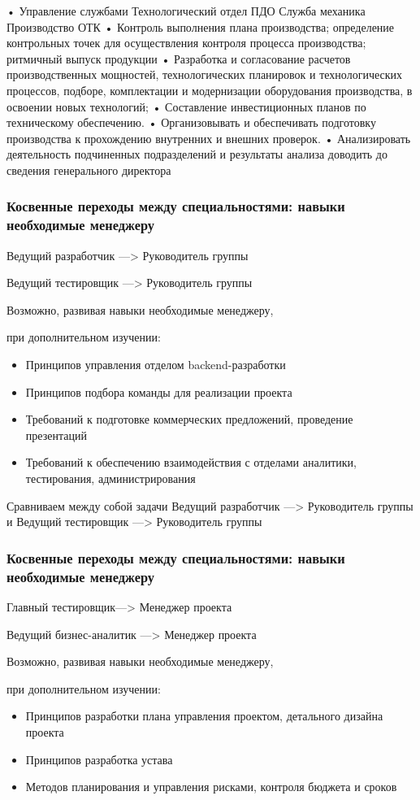 \documentclass{../industrial-development}
\begin{document}
•	Управление службами
	Технологический отдел
	ПДО
Служба механика
	Производство
	ОТК
•	Контроль выполнения плана производства; определение контрольных точек для осуществления контроля процесса производства; ритмичный выпуск продукции
•	Разработка и согласование расчетов производственных мощностей, технологических планировок и технологических процессов, подборе, комплектации и модернизации оборудования производства, в освоении новых технологий;
•	Составление инвестиционных планов по техническому обеспечению.
•	Организовывать и обеспечивать подготовку производства к прохождению внутренних и внешних проверок.
•	Анализировать деятельность подчиненных подразделений и результаты анализа доводить до сведения генерального директора


\begin{frame} \frametitle{Косвенные переходы между специальностями: навыки необходимые менеджеру}

\begin{block}{Ведущий разработчик ---> Руководитель группы  

Ведущий тестировщик ---> Руководитель группы }

Возможно, развивая навыки необходимые менеджеру, 

при дополнительном изучении:
  \end{block}
\begin{itemize}
  \item Принципов управления отделом backend-разработки
\item Принципов подбора команды для реализации проекта
\item Требований к подготовке коммерческих предложений, проведение презентаций
  \item Требований к обеспечению взаимодействия с отделами аналитики, тестирования, администрирования
  \end{itemize}
\end{frame}

\lecturenotes

Сравниваем между собой задачи Ведущий разработчик ---> Руководитель группы  и
Ведущий тестировщик ---> Руководитель группы

\begin{frame} \frametitle{Косвенные переходы между специальностями: навыки необходимые менеджеру}

\begin{block}{Главный тестировщик---> Менеджер проекта 

 Ведущий бизнес-аналитик ---> Менеджер проекта}

Возможно, развивая навыки необходимые менеджеру, 

при дополнительном изучении:
  \end{block}
  \begin{itemize}
  \item Принципов разработки плана управления проектом, детального дизайна проекта
  \item Принципов разработка устава
 \item Методов планирования и управления рисками, контроля бюджета и сроков
  \end{itemize}
\end{frame}
\end{document}
